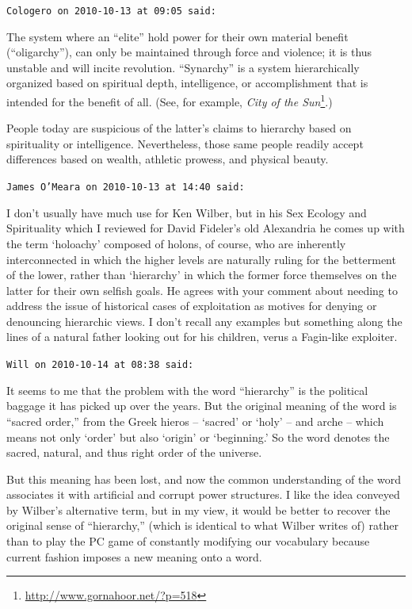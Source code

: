 \begin{footnotesize}
\begin{sffamily}
\hfill

\texttt{Cologero on 2010-10-13 at 09:05 said:}

The system where an ``elite'' hold power for their own material benefit (``oligarchy''), can only be maintained through force and violence; it is thus unstable and will incite revolution. ``Synarchy'' is a system hierarchically organized based on spiritual depth, intelligence, or accomplishment that is intended for the benefit of all. (See, for example, \textit{City of the Sun}\footnote{\url{http://www.gornahoor.net/?p=518}}.)

People today are suspicious of the latter's claims to hierarchy based on spirituality or intelligence. Nevertheless, those same people readily accept differences based on wealth, athletic prowess, and physical beauty.

\hfill

\texttt{James O'Meara on 2010-10-13 at 14:40 said:}

I don't usually have much use for Ken Wilber, but in his Sex Ecology and Spirituality which I reviewed for David Fideler's old Alexandria he comes up with the term `holoachy' composed of holons, of course, who are inherently interconnected in which the higher levels are naturally ruling for the betterment of the lower, rather than `hierarchy' in which the former force themselves on the latter for their own selfish goals. He agrees with your comment about needing to address the issue of historical cases of exploitation as motives for denying or denouncing hierarchic views. I don't recall any examples but something along the lines of a natural father looking out for his children, verus a Fagin-like exploiter.

\hfill

\texttt{Will on 2010-10-14 at 08:38 said:}

It seems to me that the problem with the word ``hierarchy'' is the political baggage it has picked up over the years. But the original meaning of the word is ``sacred order,'' from the Greek hieros -- `sacred' or `holy' -- and arche -- which means not only `order' but also `origin' or `beginning.' So the word denotes the sacred, natural, and thus right order of the universe.

But this meaning has been lost, and now the common understanding of the word associates it with artificial and corrupt power structures. I like the idea conveyed by Wilber's alternative term, but in my view, it would be better to recover the original sense of ``hierarchy,'' (which is identical to what Wilber writes of) rather than to play the PC game of constantly modifying our vocabulary because current fashion imposes a new meaning onto a word.


\end{sffamily}
\end{footnotesize}
